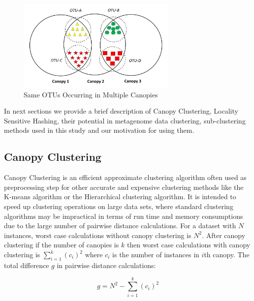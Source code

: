 \documentclass[10pt, conference, compsocconf]{IEEEtran}
\begin{document}
\begin{figure}
	\centering
	\includegraphics[width=\linewidth,height=4.5cm]{merge.jpg}	
	\caption{Same OTUs Occurring in Multiple Canopies}
	\label{fig:merge}
\end{figure}  

In next sections we provide a brief description of Canopy Clustering, Locality Sensitive Hashing, their potential in metagenome data clustering, sub-clustering methods used in this study and our motivation for using them.  

\subsection{Canopy Clustering}

Canopy Clustering \cite{MARCanopy} is an efficient approximate clustering algorithm often used as preprocessing step for other accurate and expensive clustering methods like the K-means algorithm or the Hierarchical clustering algorithm. It is intended to speed up clustering operations on large data sets, where standard clustering algorithms may be impractical in terms of run time and memory consumptions due to the large number of pairwise distance calculations. For a dataset with $N$ instances, worst case calculations without canopy clustering is $N^2$. After canopy clustering if the number of canopies is $k$ then worst case calculations with canopy clustering is $\sum_{i=1}^{k}(c_i)^2$ where $c_i$ is the number of instances in $i$th canopy. The total difference $g$ in pairwise distance calculations:

\begin{equation}
g=N^2-\sum_{i=1}^{k}(c_i)^2
\end{equation} 
\end{document}
